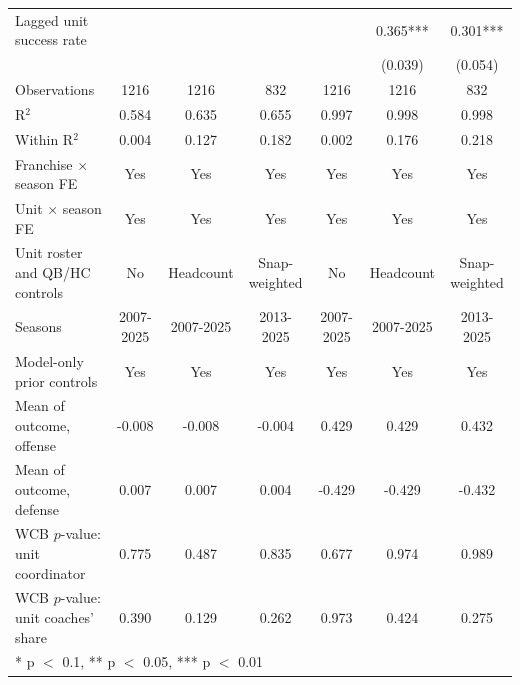 \begin{table}[H]
{\begin{tabular}[t]{lcccccc}
Lagged unit success rate &  &  &  &  & 0.365*** & 0.301***\\
 &  &  &  &  & (0.039) & (0.054)\\
\midrule
Observations & 1216 & 1216 & 832 & 1216 & 1216 & 832\\
R$^2$ & 0.584 & 0.635 & 0.655 & 0.997 & 0.998 & 0.998\\
Within R$^2$ & 0.004 & 0.127 & 0.182 & 0.002 & 0.176 & 0.218\\
Franchise $\times$ season FE & Yes & Yes & Yes & Yes & Yes & Yes\\
Unit $\times$ season FE & Yes & Yes & Yes & Yes & Yes & Yes\\
Unit roster and QB/HC controls & No & Headcount & Snap-weighted & No & Headcount & Snap-weighted\\
Seasons & 2007-2025 & 2007-2025 & 2013-2025 & 2007-2025 & 2007-2025 & 2013-2025\\
Model-only prior controls & Yes & Yes & Yes & Yes & Yes & Yes\\
Mean of outcome, offense & -0.008 & -0.008 & -0.004 & 0.429 & 0.429 & 0.432\\
Mean of outcome, defense & 0.007 & 0.007 & 0.004 & -0.429 & -0.429 & -0.432\\
WCB $p$-value: unit coordinator & 0.775 & 0.487 & 0.835 & 0.677 & 0.974 & 0.989\\
WCB $p$-value: unit coaches' share & 0.390 & 0.129 & 0.262 & 0.973 & 0.424 & 0.275\\
\bottomrule
\multicolumn{7}{l}{\rule{0pt}{1em}* p $<$ 0.1, ** p $<$ 0.05, *** p $<$ 0.01}\\
\end{tabular}}
\end{table}

